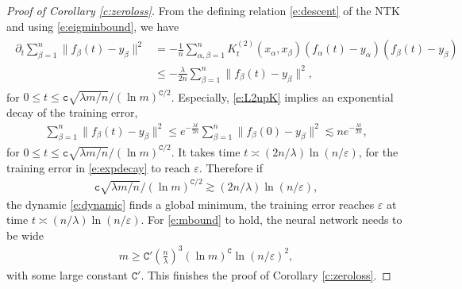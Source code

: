 \documentclass{article}
\numberwithin{equation}{section}
\newcommand{\fc}{{\mathtt c}}
\newcommand{\fC}{{\mathtt C}}
\newcommand{\al}{\alpha}
\newcommand{\la}{\lambda}
\renewcommand{\leq}{\leqslant}
\renewcommand{\geq}{\geqslant}
\newcommand{\del}{\partial}
\newcommand{\1}{\mathds{1}}
\theoremstyle{plain} %
\begin{document}
\begin{proof}[Proof of Corollary \ref{c:zeroloss}]
From the defining relation \eqref{e:descent} of the NTK and using \eqref{e:eigminbound}, we have
\begin{align}\begin{split}\label{e:L2upK}
\del_t \sum_{\beta=1}^n\|f_\beta(t)-y_\beta\|^2
&=-\frac{1}{n}\sum_{\al, \beta=1}^nK_t^{(2)}(x_\al, x_\beta)(f_\al(t)-y_\al)(f_\beta(t)-y_\beta)\\
&\leq -\frac{\la}{2n}\sum_{\beta=1}^n\|f_\beta(t)-y_\beta\|^2,
\end{split}\end{align}
for $0\leq t\leq \fc\sqrt{\la m/n}/(\ln m)^{\fC/2}$. Especially, \eqref{e:L2upK} implies an exponential decay of the training error,
\begin{align}\label{e:expdecay}
\sum_{\beta=1}^n\|f_\beta(t)-y_\beta\|^2
\leq e^{-\frac{\la t}{2n}}\sum_{\beta=1}^n\|f_\beta(0)-y_\beta\|^2
\lesssim n e^{-\frac{\la t}{2n}},
\end{align}
for $0\leq t\leq  \fc\sqrt{\la m/n}/(\ln m)^{\fC/2}$. It takes time $t\asymp (2n/\la)\ln(n/\varepsilon)$, for the training error in \eqref{e:expdecay} to reach $\varepsilon$. Therefore if 
\begin{align}\label{e:mbound}
\fc\sqrt{\la m/n}/(\ln m)^{\fC/2}\gtrsim(2n/\la)\ln(n/\varepsilon),
\end{align}
the dynamic \eqref{e:dynamic} finds a global minimum, the training error reaches $\varepsilon$ at time $t\asymp (n/\la)\ln(n/\varepsilon)$. For \eqref{e:mbound} to hold, the neural network needs to be wide
\begin{align*}
m\geq \fC'\left(\frac{n}{\la}\right)^3(\ln m)^{\fC}\ln(n/\varepsilon)^2,
\end{align*} 
with some large constant $\fC'$. This finishes the proof of Corollary \ref{c:zeroloss}.
\end{proof}
\end{document}
